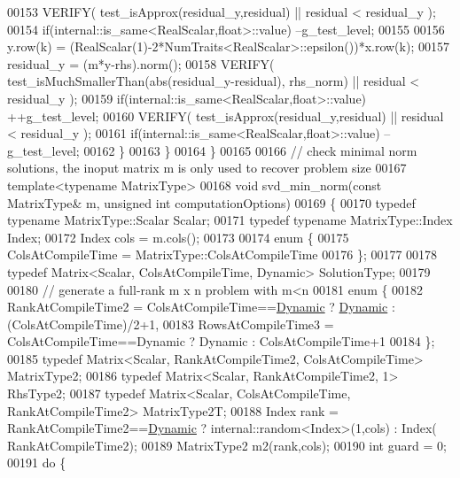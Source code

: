\begin{DoxyCode}
00153       VERIFY( test\_isApprox(residual\_y,residual) || residual < residual\_y );
00154       \textcolor{keywordflow}{if}(internal::is\_same<RealScalar,float>::value) --g\_test\_level;
00155       
00156       y.row(k) = (RealScalar(1)-2*NumTraits<RealScalar>::epsilon())*x.row(k);
00157       residual\_y = (m*y-rhs).norm();
00158       VERIFY( test\_isMuchSmallerThan(abs(residual\_y-residual), rhs\_norm) || residual < residual\_y );
00159       \textcolor{keywordflow}{if}(internal::is\_same<RealScalar,float>::value) ++g\_test\_level;
00160       VERIFY( test\_isApprox(residual\_y,residual) || residual < residual\_y );
00161       \textcolor{keywordflow}{if}(internal::is\_same<RealScalar,float>::value) --g\_test\_level;
00162     \}
00163   \}
00164 \}
00165 
00166 \textcolor{comment}{// check minimal norm solutions, the inoput matrix m is only used to recover problem size}
00167 \textcolor{keyword}{template}<\textcolor{keyword}{typename} MatrixType>
00168 \textcolor{keywordtype}{void} svd\_min\_norm(\textcolor{keyword}{const} MatrixType& m, \textcolor{keywordtype}{unsigned} \textcolor{keywordtype}{int} computationOptions)
00169 \{
00170   \textcolor{keyword}{typedef} \textcolor{keyword}{typename} MatrixType::Scalar Scalar;
00171   \textcolor{keyword}{typedef} \textcolor{keyword}{typename} MatrixType::Index Index;
00172   Index cols = m.cols();
00173 
00174   \textcolor{keyword}{enum} \{
00175     ColsAtCompileTime = MatrixType::ColsAtCompileTime
00176   \};
00177 
00178   \textcolor{keyword}{typedef} Matrix<Scalar, ColsAtCompileTime, Dynamic> SolutionType;
00179 
00180   \textcolor{comment}{// generate a full-rank m x n problem with m<n}
00181   \textcolor{keyword}{enum} \{
00182     RankAtCompileTime2 = ColsAtCompileTime==\hyperlink{namespace_eigen_ad81fa7195215a0ce30017dfac309f0b2}{Dynamic} ? \hyperlink{namespace_eigen_ad81fa7195215a0ce30017dfac309f0b2}{Dynamic} : (ColsAtCompileTime)/2+1,
00183     RowsAtCompileTime3 = ColsAtCompileTime==Dynamic ? Dynamic : ColsAtCompileTime+1
00184   \};
00185   \textcolor{keyword}{typedef} Matrix<Scalar, RankAtCompileTime2, ColsAtCompileTime> MatrixType2;
00186   \textcolor{keyword}{typedef} Matrix<Scalar, RankAtCompileTime2, 1> RhsType2;
00187   \textcolor{keyword}{typedef} Matrix<Scalar, ColsAtCompileTime, RankAtCompileTime2> MatrixType2T;
00188   Index rank = RankAtCompileTime2==\hyperlink{namespace_eigen_ad81fa7195215a0ce30017dfac309f0b2}{Dynamic} ? internal::random<Index>(1,cols) : Index(
      RankAtCompileTime2);
00189   MatrixType2 m2(rank,cols);
00190   \textcolor{keywordtype}{int} guard = 0;
00191   \textcolor{keywordflow}{do} \{

\end{DoxyCode}
